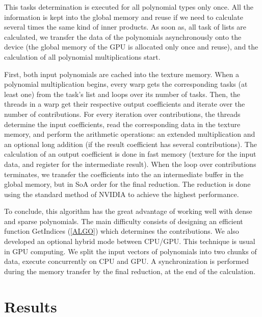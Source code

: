 \documentclass[oribibl]{llncs2e/llncs}
\begin{document}
This tasks determination is executed for all polynomial types only once. All the information is kept into the global memory and reuse if we need to calculate several times the same kind of inner products.
 As soon as,  all task of lists are calculated,  we transfer the data of the polynomials asynchronously onto the device (the global memory of the GPU is allocated only once and reuse),
 and the calculation of all polynomial multiplications start.
 
 First, both input polynomials  are cached into the texture memory. 
When a polynomial multiplication begins,  every warp gets the corresponding tasks (at least one) from the task's list and loops over its number of tasks. Then,
the threads in a warp get their respective output coefficients and iterate over the number of  contributions.
For every iteration over contributions, the threads determine the input coefficients, read the corresponding data in the texture memory, and perform the arithmetic operations: an extended multiplication and an optional long addition (if the result coefficient has several contributions). The calculation of an output coefficient  is  done in fast memory (texture for the input data, and register for the intermediate result). 
When the loop over contributions terminates,  we transfer the coefficients into the an intermediate buffer in the global memory, but in SoA  order for the final reduction. 
The reduction is done using the standard method of NVIDIA \cite{CUDAReduction} to achieve the highest performance.


To conclude, this  algorithm has the great advantage of working well with dense and sparse polynomials. 
The main difficulty consists  of designing an efficient function GetIndices (\ref{ALGO}) which determines the contributions.
 We also developed an optional hybrid mode between CPU/GPU. This  technique is usual in GPU computing.
  We split the input vectors of polynomials into two chunks of data, execute concurrently on CPU and GPU. 
  A synchronization  is performed during  the memory transfer   by the final reduction, at the end of the calculation.

\section{Results}
\end{document}
